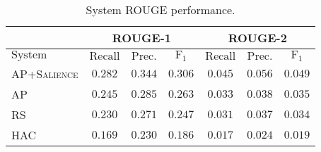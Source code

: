 \begin{table}
\centering
\begin{tabular}{l c c c c c c }
& \multicolumn{3}{c}{ROUGE-1} & \multicolumn{3}{c}{ROUGE-2} \\
\hline
\hline
$\mathrm{System}$ & $\mathrm{Recall}$ & $\mathrm{Prec.}$ & $\mathrm{F}_1$
  & $\mathrm{Recall}$ & $\mathrm{Prec.}$ & $\mathrm{F}_1$\\
\hline
\textsc{AP+Salience} & $\mathbf{0.282}$ & $\mathbf{0.344}$ & $\mathbf{0.306}$
                     & $\mathbf{0.045}$ & $\mathbf{0.056}$ & $\mathbf{0.049}$\\
\textsc{AP}          & $0.245$ & $0.285$ & $0.263$ 
                     & $0.033$ & $0.038$ & $0.035$ \\
\textsc{RS}          & $0.230$ & $0.271$ & $0.247$ 
                     & $0.031$ & $0.037$ & $0.034$ \\
\textsc{HAC}         & $0.169$ & $0.230$ & $0.186$ 
                     & $0.017$ & $0.024$ & $0.019$ \\
\hline 
\end{tabular}
\caption{System ROUGE performance.} 
\label{tab:aps_rouge}
\end{table}
